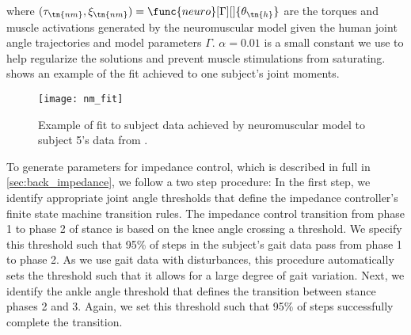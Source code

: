 where $(\tau_\tn{nm}, \xi_\tn{nm}) = \func{neuro}[\Gamma][]{\theta_\tn{h}}$ are
the torques and muscle activations generated by the neuromuscular model given
the human joint angle trajectories and model parameters $\Gamma$. $\alpha =
0.01$ is a small constant we use to help regularize the solutions and prevent
muscle stimulations from saturating.  shows an
example of the fit achieved to one subject's joint moments.
\begin{figure}[t]
    \centering 
    \texttt{[image: nm\_fit]}
    \caption{Example of fit to subject data achieved by neuromuscular model to
    subject 5's data from
    \citet{moore2015elaborate}.}\label{fig:treadmill_nm_fit}
\end{figure}

To generate parameters for impedance control, which is described in full in
\cref{sec:back_impedance}, we follow a two step procedure: In the first step, we
identify appropriate joint angle thresholds that define the impedance
controller's finite state machine transition rules. The impedance control
transition from phase 1 to phase 2 of stance is based on the knee angle crossing
a threshold. We specify this threshold such that 95\% of steps in the subject's
gait data pass from phase 1 to phase 2. As we use gait data with disturbances,
this procedure automatically sets the threshold such that it allows for a large
degree of gait variation. Next, we identify the ankle angle threshold that
defines the transition between stance phases 2 and 3. Again, we set this
threshold such that 95\% of steps successfully complete the transition.

